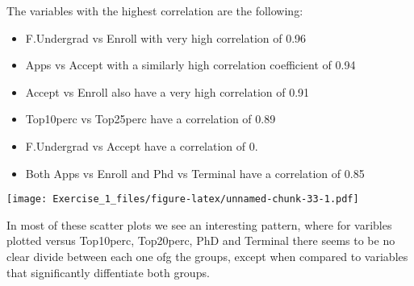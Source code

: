 \documentclass[]{article}
\newenvironment{Shaded}{\begin{snugshade}}{\end{snugshade}}
\newcommand{\CommentTok}[1]{\textcolor[rgb]{0.56,0.35,0.01}{\textit{#1}}}
\newcommand{\ControlFlowTok}[1]{\textcolor[rgb]{0.13,0.29,0.53}{\textbf{#1}}}
\newcommand{\DataTypeTok}[1]{\textcolor[rgb]{0.13,0.29,0.53}{#1}}
\newcommand{\DecValTok}[1]{\textcolor[rgb]{0.00,0.00,0.81}{#1}}
\newcommand{\KeywordTok}[1]{\textcolor[rgb]{0.13,0.29,0.53}{\textbf{#1}}}
\newcommand{\NormalTok}[1]{#1}
\newcommand{\OperatorTok}[1]{\textcolor[rgb]{0.81,0.36,0.00}{\textbf{#1}}}
\newcommand{\StringTok}[1]{\textcolor[rgb]{0.31,0.60,0.02}{#1}}
\providecommand{\tightlist}{%
  \setlength{\itemsep}{0pt}\setlength{\parskip}{0pt}}
\begin{document}
The variables with the highest correlation are the following:

\begin{itemize}
\tightlist
\item
  F.Undergrad vs Enroll with very high correlation of 0.96
\item
  Apps vs Accept with a similarly high correlation coefficient of 0.94
\item
  Accept vs Enroll also have a very high correlation of 0.91
\item
  Top10perc vs Top25perc have a correlation of 0.89
\item
  F.Undergrad vs Accept have a correlation of 0.
\item
  Both Apps vs Enroll and Phd vs Terminal have a correlation of 0.85
\end{itemize}

\begin{Shaded}
\end{Shaded}

\begin{Shaded}
\end{Shaded}

\texttt{[image: Exercise\_1\_files/figure-latex/unnamed-chunk-33-1.pdf]}

In most of these scatter plots we see an interesting pattern, where for
varibles plotted versus Top10perc, Top20perc, PhD and Terminal there
seems to be no clear divide between each one ofg the groups, except when
compared to variables that significantly diffentiate both groups.
\end{document}
